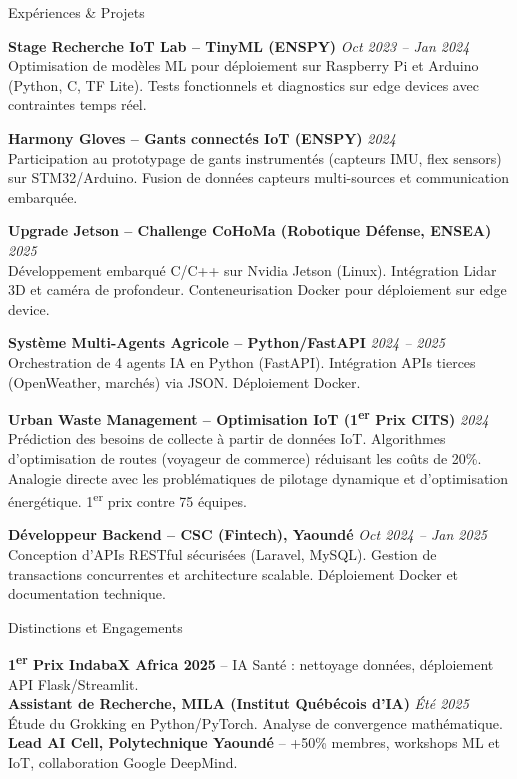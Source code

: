 \documentclass[10pt]{resume}
\begin{document}
\begin{rSection}{Expériences \& Projets}

{\bf Stage Recherche IoT Lab -- TinyML (ENSPY)} \hfill {\em Oct 2023 -- Jan 2024}\\
Optimisation de modèles ML pour déploiement sur Raspberry Pi et Arduino (Python, C, TF Lite). Tests fonctionnels et diagnostics sur edge devices avec contraintes temps réel.

{\bf Harmony Gloves -- Gants connectés IoT (ENSPY)} \hfill {\em 2024}\\
Participation au prototypage de gants instrumentés (capteurs IMU, flex sensors) sur STM32/Arduino. Fusion de données capteurs multi-sources et communication embarquée.

{\bf Upgrade Jetson -- Challenge CoHoMa (Robotique Défense, ENSEA)} \hfill {\em 2025}\\
Développement embarqué C/C++ sur Nvidia Jetson (Linux). Intégration Lidar 3D et caméra de profondeur. Conteneurisation Docker pour déploiement sur edge device.

{\bf Système Multi-Agents Agricole -- Python/FastAPI} \hfill {\em 2024 -- 2025}\\
Orchestration de 4 agents IA en Python (FastAPI). Intégration APIs tierces (OpenWeather, marchés) via JSON. Déploiement Docker.

{\bf Urban Waste Management -- Optimisation IoT (1\textsuperscript{er} Prix CITS)} \hfill {\em 2024}\\
Prédiction des besoins de collecte à partir de données IoT. Algorithmes d'optimisation de routes (voyageur de commerce) réduisant les coûts de 20\%. Analogie directe avec les problématiques de pilotage dynamique et d'optimisation énergétique. 1\textsuperscript{er} prix contre 75 équipes.

{\bf Développeur Backend -- CSC (Fintech), Yaoundé} \hfill {\em Oct 2024 -- Jan 2025}\\
Conception d'APIs RESTful sécurisées (Laravel, MySQL). Gestion de transactions concurrentes et architecture scalable. Déploiement Docker et documentation technique.

\end{rSection}

\begin{rSection}{Distinctions et Engagements}

\textbf{1\textsuperscript{er} Prix IndabaX Africa 2025} -- IA Santé : nettoyage données, déploiement API Flask/Streamlit. \\
\textbf{Assistant de Recherche, MILA (Institut Québécois d'IA)} \hfill \textit{Été 2025} \\
Étude du Grokking en Python/PyTorch. Analyse de convergence mathématique. \\
\textbf{Lead AI Cell, Polytechnique Yaoundé} -- +50\% membres, workshops ML et IoT, collaboration Google DeepMind.

\end{rSection}
\end{document}
